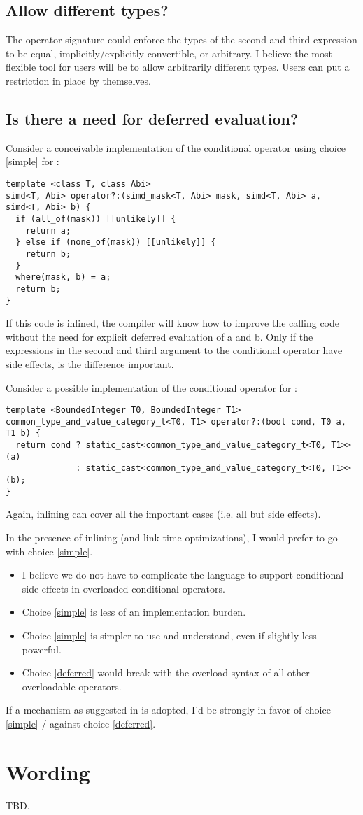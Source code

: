 \subsection{Allow different types?}
The operator signature could enforce the types of the second and third expression to be equal, implicitly/explicitly convertible, or arbitrary.
I believe the most flexible tool for users will be to allow arbitrarily different types.
Users can put a restriction in place by themselves.

\subsection{Is there a need for deferred evaluation?}
Consider a conceivable implementation of the conditional operator using choice \ref{simple} for :
\smallskip\begin{lstlisting}[style=Vc]
template <class T, class Abi>
simd<T, Abi> operator?:(simd_mask<T, Abi> mask, simd<T, Abi> a, simd<T, Abi> b) {
  if (all_of(mask)) [[unlikely]] {
    return a;
  } else if (none_of(mask)) [[unlikely]] {
    return b;
  }
  where(mask, b) = a;
  return b;
}
\end{lstlisting}
If this code is inlined, the compiler will know how to improve the calling code without the need for explicit deferred evaluation of \code a and \code b.
Only if the expressions in the second and third argument to the conditional operator have side effects, is the difference important.

Consider a possible implementation of the conditional operator for :
\smallskip\begin{lstlisting}[style=Vc]
template <BoundedInteger T0, BoundedInteger T1>
common_type_and_value_category_t<T0, T1> operator?:(bool cond, T0 a, T1 b) {
  return cond ? static_cast<common_type_and_value_category_t<T0, T1>>(a)
              : static_cast<common_type_and_value_category_t<T0, T1>>(b);
}
\end{lstlisting}
Again, inlining can cover all the important cases (i.e. all but side effects).

In the presence of inlining (and link-time optimizations), I would prefer to go with choice \ref{simple}.
\begin{itemize}
  \item I believe we do not have to complicate the language to support conditional side effects in overloaded conditional operators.
  \item Choice \ref{simple} is less of an implementation burden.
  \item Choice \ref{simple} is simpler to use and understand, even if slightly less powerful.
  \item Choice \ref{deferred} would break with the overload syntax of all other overloadable operators.
\end{itemize}
If a mechanism as suggested in \textcite{P0927R0} is adopted, I'd be strongly in favor of choice \ref{simple} / against choice \ref{deferred}.

\section{Wording}
TBD.





